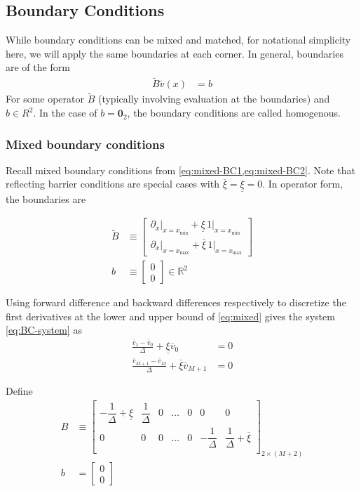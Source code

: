 \documentclass[11pt]{article}
\newcommand{\R}{\ensuremath{\mathbb{R}}}
\theoremstyle{definition}
\begin{document}
\subsection{Boundary Conditions}
While boundary conditions can be mixed and matched, for notational simplicity here, we will apply the same boundaries at each corner.  In general, boundaries are of the form
\begin{align}
\tilde{B} \tilde{v}(x) &= b\label{eq:BC-system}
\end{align}
For some operator $\tilde{B}$ (typically involving evaluation at the boundaries) and $b\in R^2$.  In the case of $b = \textbf{0}_2$, the boundary conditions are called homogenous.

\subsubsection{Mixed boundary conditions}
Recall mixed boundary conditions from \cref{eq:mixed-BC1,eq:mixed-BC2}. Note that reflecting barrier conditions are special cases with $\overline{\xi} = \underline{\xi} = 0$.  In operator form, the boundaries are

\begin{align}
\tilde{B} &\equiv \begin{bmatrix}
\partial_x\vert_{x = x_{\min}} + \underline{\xi}\,1 \vert_{x = x_{\min}}\\
\partial_x\vert_{x = x_{\max}} + \bar{\xi}\,1 \vert_{x = x_{\max}}
\end{bmatrix}\label{eq:mixed}\\
b &\equiv \begin{bmatrix} 0\\ 0 \end{bmatrix}\in \R^2
\end{align}

Using forward difference and backward differences respectively to discretize the first derivatives at the lower and upper bound of \cref{eq:mixed} gives the system \cref{eq:BC-system} as
\begin{align}
\frac{\overline{v}_1 - \overline{v}_0}{\Delta} + \underline{\xi} \overline{v}_0 &= 0\label{eq:regular-mixed-1} \\
\frac{\overline{v}_{M+1} - \overline{v}_M}{\Delta} + \overline{\xi} \overline{v}_{M+1} &= 0\label{eq:regular-mixed-2}
\end{align}

Define
\begin{align}
B &\equiv \begin{bmatrix}
-\dfrac{1}{\Delta} + \underline{\xi} & \dfrac{1}{\Delta} & 0 & \dots & 0 & 0 & 0 \\
0 & 0 & 0 & \dots & 0 & -\dfrac{1}{\Delta} & \dfrac{1}{\Delta} + \overline{\xi}\\
\end{bmatrix}_{2 \times (M+2)}\label{eq:mixed-barrier-matrix-original-regular}\\
b &= \begin{bmatrix}
0 \\
0
\end{bmatrix}
\end{align}
\end{document}
